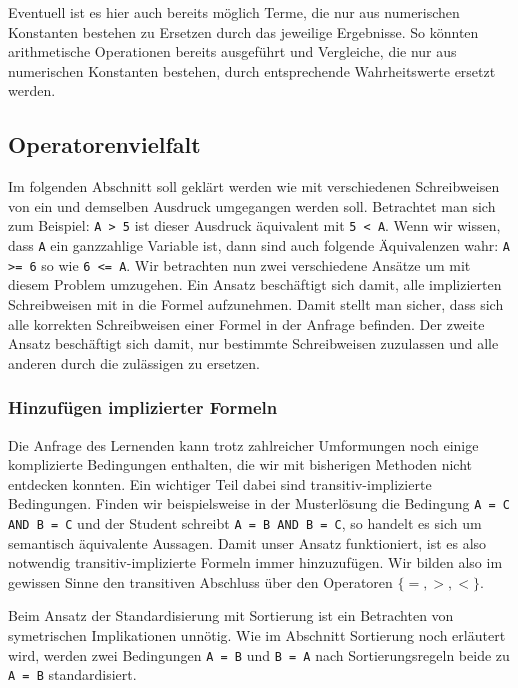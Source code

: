 Eventuell ist es hier auch bereits möglich Terme, die nur aus numerischen Konstanten bestehen zu Ersetzen durch das jeweilige Ergebnisse. So könnten arithmetische Operationen bereits ausgeführt und Vergleiche, die nur aus numerischen Konstanten bestehen, durch entsprechende Wahrheitswerte ersetzt werden.

\subsection{Operatorenvielfalt}

Im folgenden Abschnitt soll geklärt werden wie mit verschiedenen Schreibweisen von ein und demselben Ausdruck umgegangen werden soll. Betrachtet man sich zum Beispiel: \verb|A > 5| ist dieser Ausdruck äquivalent mit \verb|5 < A|. Wenn wir wissen, dass \verb|A| ein ganzzahlige Variable ist, dann sind auch folgende Äquivalenzen wahr: \verb|A >= 6| so wie \verb|6 <= A|. Wir betrachten nun zwei verschiedene Ansätze um mit diesem Problem umzugehen. Ein Ansatz beschäftigt sich damit, alle implizierten Schreibweisen mit in die Formel aufzunehmen. Damit stellt man sicher, dass sich alle korrekten Schreibweisen einer Formel in der Anfrage befinden. Der zweite Ansatz beschäftigt sich damit, nur bestimmte Schreibweisen zuzulassen und alle anderen durch die zulässigen zu ersetzen.

\subsubsection{Hinzufügen implizierter Formeln}

Die Anfrage des Lernenden kann trotz zahlreicher Umformungen noch einige komplizierte Bedingungen enthalten, die wir mit bisherigen Methoden nicht entdecken konnten. Ein wichtiger Teil dabei sind transitiv-implizierte Bedingungen. Finden wir beispielsweise in der Musterlösung die Bedingung \verb|A = C AND B = C| und der Student schreibt \verb|A = B AND B = C|, so handelt es sich um semantisch äquivalente Aussagen. Damit unser Ansatz funktioniert, ist es also notwendig transitiv-implizierte Formeln immer hinzuzufügen. Wir bilden also im gewissen Sinne den transitiven Abschluss über den Operatoren $\{=,>,<\}$.

Beim Ansatz der Standardisierung mit Sortierung ist ein Betrachten von symetrischen Implikationen unnötig. Wie im Abschnitt Sortierung noch erläutert wird, werden zwei Bedingungen \verb|A = B| und \verb|B = A| nach Sortierungsregeln beide zu \verb|A = B| standardisiert. 

